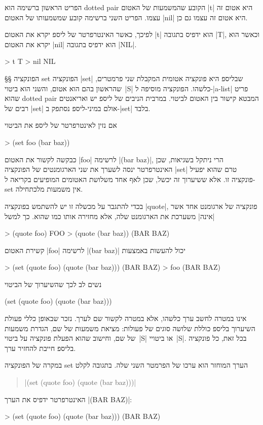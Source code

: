 הפריט הראשון ברשימה הוא dotted pair הקובע שהמשמעות של האטום \T|t| היא אטום זה
עצמו. הפריט השני ברשימה קובע שמשמעותו של האטום \T|nil| היא אטום זה עצמו גם כן.

לפיכך, כאשר האינטרפרטר של ליספ יקרא את האטום \T|t| הוא ידפיס בתגובה \T|T|,
וכאשר הוא יקרא את האטום \T|nil| הוא ידפיס בתגובה \T|NIL|.
\begin{LISP}
> t
T
> nil
NIL
\end{LISP}

§§ הפונקציה set
הפונקציה \T|set| שבליספ היא פונקציה אטומית המקבלת שני פרמטרים, שהראשון בהם
הוא אטום, והשני הוא ביטוי~\E|S| כלשהו. הפונקציה מוסיפה ל-\E|a-list| פריט שהוא
dotted pair המבטא קישור בין האטום לביטוי. במרבית הניבים של ליספ יש ואריאנטים
רבים של \T|set| אולם במיני-ליספ נסתפק ב-\T|set| בלבד.

אם נזין לאינטרפרטר של ליספ את הביטוי
\begin{LISP}
> (set foo (bar baz))
\end{LISP}
כבקשה לקשור את האטום \T|foo| לרשימה \T|(bar baz)|, הרי ניתקל בשגיאות, שכן
האינטרפרטר ינסה לשערך את שני הארגומנטים של הפונקציה \E|set| טרם שהוא יפעיל
פונקציה זו. אלא ששיערוך זה יכשל, שכן לאף אחד משלושת האטומים המופיעים בקריאה
ל-set אין משמעות מלכתחילה.

בכדי להתגבר על מכשלה זו יש להשתמש בפונקציה \T|quote|, פונקציה של ארגומנט אחד
אשר \ע|אינה| משערכת את הארגומנט שלה, אלא מחזירה אותו כמו שהוא.
כך למשל
\begin{LISP}
> (quote foo)
FOO
> (quote (bar baz))
(BAR BAZ)
\end{LISP}
קשירת האטום \T|foo| לרשימה \T|(bar baz)| יכול להעשות באמצעות
\begin{LISP}
> (set (quote foo) (quote (bar baz)))
(BAR BAZ)
> foo
(BAR BAZ)
\end{LISP}
נשים לב לכך שהשיערוך של הביטוי
\begin{LISP}
(set (quote foo) (quote (bar baz)))
\end{LISP}
אינו במטרה לחשב ערך כלשהו, אלא במטרה לקשור שם לערך. נזכר שבאופן כללי פעולת
השיערוך בליספ כוללת שלושה סוגים של פעולות: מציאת משמעות של שם, הגדרת משמעות של
שם, וחישוב שהוא הפעלת פונקציה על ביטוי~\E|S| או ביטויי~\E|S|. בכל זאת, כל
פונקציה בליספ חייבת להחזיר ערך.

במקרה של הפונקציה set הערך המוחזר הוא ערכו של הפרמטר השני שלה. בתגובה לקלט
\begin{quote}
\T|(set (quote foo) (quote (bar baz)))|
\end{quote}
האינטרפרטר ידפיס את הערך \T|(BAR BAZ)|:
\begin{LISP}
> (set (quote foo) (quote (bar baz)))
(BAR BAZ)
\end{LISP}

